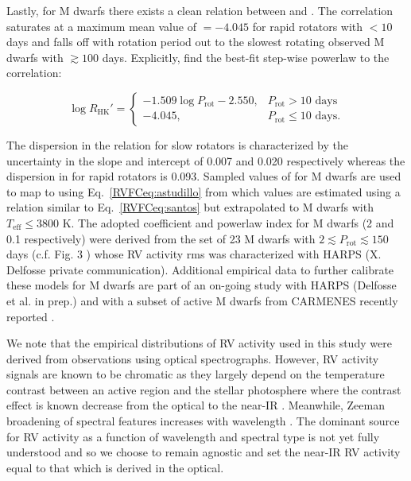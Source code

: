 Lastly, for M dwarfs there exists a clean relation between \Rhk{} and \prot{} \citep{astudillodefru17b}.
The correlation saturates at a maximum mean value of \Rhk{} $=-4.045$ for rapid rotators with \prot{} $< 10$
days and falls off with rotation period out to the slowest rotating observed M dwarfs with \prot{} $\gtrsim 100$
days. Explicitly, \cite{astudillodefru17b} find the best-fit step-wise powerlaw to the correlation:

\begin{equation}
  \log{R_{\text{HK}}'}  =
  \begin{cases}
    -1.509 \log{P_{\text{rot}}} -2.550, & P_{\text{rot}} > 10 \text{ days} \\
    -4.045, & P_{\text{rot}} \leq 10 \text{ days}.
  \end{cases} \label{RVFCeq:astudillo}
\end{equation}

\noindent The dispersion in the relation for slow rotators is characterized by the uncertainty in the slope and
intercept of 0.007 and 0.020 respectively whereas the dispersion in \Rhk{} for rapid rotators is 0.093. Sampled
values of \prot{} for M dwarfs are used to map to \Rhk{} using Eq.~\ref{RVFCeq:astudillo} from which \sigact{} values
are estimated using a relation similar to Eq.~\ref{RVFCeq:santos} but extrapolated to M dwarfs 
with $T_{\text{eff}} \leq 3800$ K. The adopted coefficient and powerlaw index for M dwarfs (2 \mps{} and 0.1
respectively) were derived from the set of 23
M dwarfs with $2 \lesssim P_{\text{rot}} \lesssim 150$ days (c.f. Fig. 3 \citealt{cloutier18})
whose RV activity rms was characterized with HARPS (X. Delfosse private communication).
Additional empirical data to further
calibrate these models for M dwarfs are part of an on-going study with HARPS
(Delfosse et al. in prep.) and with a subset of active M dwarfs from CARMENES recently reported \citep{tal-or18}.

We note that the
empirical distributions of RV activity used in this study were derived from observations using optical
spectrographs. However, RV activity signals are known to be chromatic as they largely
depend on the temperature contrast between an active region and the stellar photosphere where the contrast
effect is known decrease from the optical to the near-IR
\citep[e.g.][]{martin06,huelamo08,prato08,reiners10,mahmud11}. Meanwhile, Zeeman broadening of spectral
features increases with wavelength \citep{reiners13}. The dominant source for RV activity as a function of wavelength
and spectral type is not yet fully understood \citep{moutou17} and so we choose to remain agnostic and set
the near-IR RV activity equal to that which is derived in the optical.


